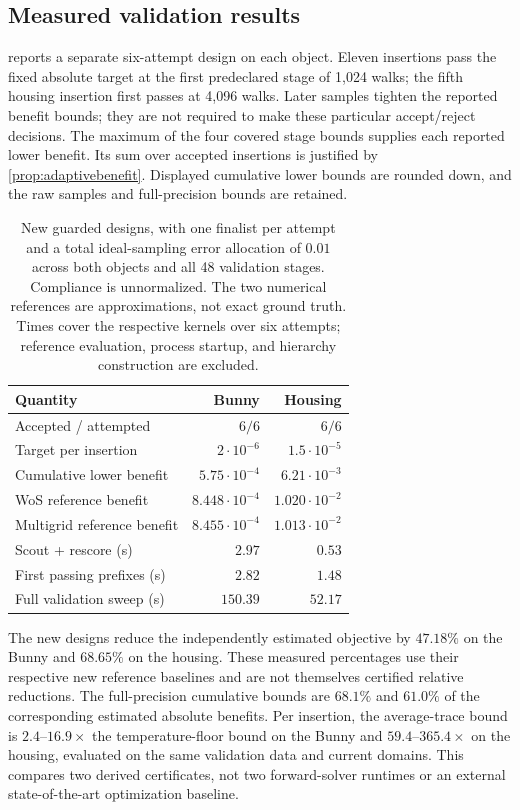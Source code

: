 \subsection{Measured validation results}
\label{app:applicationvalidationresults}

 reports a separate six-attempt design on
each object. Eleven insertions pass the fixed absolute target at the
first predeclared stage of 1,024 walks; the fifth housing insertion first
passes at 4,096 walks. Later samples tighten the reported
benefit bounds; they are not required to make these particular accept/reject
decisions. The maximum of the four covered stage bounds supplies each
reported lower benefit. Its sum over accepted insertions is justified by
\cref{prop:adaptivebenefit}. Displayed cumulative lower bounds are rounded
down, and the raw samples and full-precision bounds are retained.

\begin{table}[t]
\centering\small
\caption{New guarded designs, with one finalist per attempt and a total
ideal-sampling error allocation of $0.01$ across both objects and all
48 validation stages. Compliance is unnormalized. The two numerical
references are approximations, not exact ground truth. Times cover the
respective kernels over six attempts; reference evaluation, process startup,
and hierarchy construction are excluded.}
\label{tab:applicationvalidation}
\begin{tabular}{lrr}
\toprule
Quantity & Bunny & Housing\\
\midrule
Accepted / attempted & $6/6$ & $6/6$\\
Target per insertion & $2\cdot10^{-6}$ & $1.5\cdot10^{-5}$\\
Cumulative lower benefit & $5.75\cdot10^{-4}$ & $6.21\cdot10^{-3}$\\
WoS reference benefit & $8.448\cdot10^{-4}$ & $1.020\cdot10^{-2}$\\
Multigrid reference benefit & $8.455\cdot10^{-4}$ & $1.013\cdot10^{-2}$\\
Scout + rescore (s) & $2.97$ & $0.53$\\
First passing prefixes (s) & $2.82$ & $1.48$\\
Full validation sweep (s) & $150.39$ & $52.17$\\
\bottomrule
\end{tabular}
\end{table}

The new designs reduce the independently estimated objective by $47.18\%$
on the Bunny and $68.65\%$ on the housing. These measured percentages use
their respective new reference baselines and are not themselves certified
relative reductions. The full-precision cumulative bounds are $68.1\%$
and $61.0\%$ of the corresponding estimated absolute benefits. Per insertion,
the average-trace bound is $2.4$--$16.9\times$ the temperature-floor bound
on the Bunny and $59.4$--$365.4\times$ on the housing, evaluated on the
same validation data and current domains. This compares two derived
certificates, not two forward-solver runtimes or an external state-of-the-art
optimization baseline.

